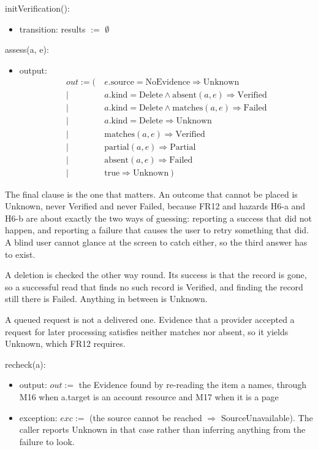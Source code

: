 \documentclass[12pt, titlepage]{article}
\begin{document}
\noindent initVerification():
\begin{itemize}
\item transition: results $:=$ $\emptyset$
\end{itemize}

\noindent assess(a, e):
\begin{itemize}
\item output:
\begin{align*}
out := (\ &e.\text{source} = \text{NoEvidence} \Rightarrow \text{Unknown}\\
 |\ &a.\text{kind} = \text{Delete} \wedge \text{absent}(a, e) \Rightarrow \text{Verified}\\
 |\ &a.\text{kind} = \text{Delete} \wedge \text{matches}(a, e) \Rightarrow \text{Failed}\\
 |\ &a.\text{kind} = \text{Delete} \Rightarrow \text{Unknown}\\
 |\ &\text{matches}(a, e) \Rightarrow \text{Verified}\\
 |\ &\text{partial}(a, e) \Rightarrow \text{Partial}\\
 |\ &\text{absent}(a, e) \Rightarrow \text{Failed}\\
 |\ &\text{true} \Rightarrow \text{Unknown}\ )
\end{align*}
\end{itemize}

\noindent The final clause is the one that matters. An outcome that cannot be
placed is Unknown, never Verified and never Failed, because FR12 and hazards
H6-a and H6-b are about exactly the two ways of guessing: reporting a success
that did not happen, and reporting a failure that causes the user to retry
something that did. A blind user cannot glance at the screen to catch either, so
the third answer has to exist.

\noindent A deletion is checked the other way round. Its success is that the
record is gone, so a successful read that finds no such record is Verified, and
finding the record still there is Failed. Anything in between is Unknown.

\noindent A queued request is not a delivered one. Evidence that a provider
accepted a request for later processing satisfies neither matches nor absent,
so it yields Unknown, which FR12 requires.

\noindent recheck(a):
\begin{itemize}
\item output: $out :=$ the Evidence found by re-reading the item a names,
through M16 when a.target is an account resource and M17 when it is a page
\item exception: $exc :=$ (the source cannot be reached $\Rightarrow$
SourceUnavailable). The caller reports Unknown in that case rather than
inferring anything from the failure to look.
\end{itemize}
\end{document}
